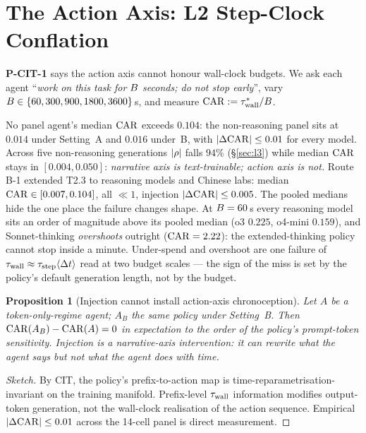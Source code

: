 \documentclass{article}
\newtheorem{proposition}{Proposition}
\begin{document}
\section{The Action Axis: L2 Step-Clock Conflation}\label{sec:l2}

\textbf{P-CIT-1} says the action axis cannot honour wall-clock budgets. We ask each agent ``\emph{work on this task for $B$ seconds; do not stop early}'', vary $B \in \{60, 300, 900, 1800, 3600\}$\,s, and measure $\mathrm{CAR} := \tau_{\mathrm{wall}}^{*} / B$.

No panel agent's median $\mathrm{CAR}$ exceeds $0.104$: the non-reasoning panel sits at $0.014$ under Setting~A and $0.016$ under~B, with $|\Delta\mathrm{CAR}| \leq 0.01$ for every model. Across five non-reasoning generations $|\rho|$ falls $94\%$ (\S\ref{sec:l3}) while median $\mathrm{CAR}$ stays in $[0.004, 0.050]$: \emph{narrative axis is text-trainable; action axis is not.} Route B-1 extended T2.3 to reasoning models and Chinese labs: median $\mathrm{CAR} \in [0.007, 0.104]$, all $\ll 1$, injection $|\Delta\mathrm{CAR}| \leq 0.005$. The pooled medians hide the one place the failure changes shape. At $B = 60$\,s every reasoning model sits an order of magnitude above its pooled median (o3 $0.225$, o4-mini $0.159$), and Sonnet-thinking \emph{overshoots} outright ($\mathrm{CAR} = 2.22$): the extended-thinking policy cannot stop inside a minute. Under-spend and overshoot are one failure of $\tau_{\mathrm{wall}} \approx \tau_{\mathrm{step}}\langle\Delta t\rangle$ read at two budget scales --- the sign of the miss is set by the policy's default generation length, not by the budget.

\begin{proposition}[Injection cannot install action-axis chronoception]\label{prop:inj}
Let $A$ be a token-only-regime agent; $A_B$ the same policy under Setting~B. Then $\mathrm{CAR}(A_B) - \mathrm{CAR}(A) = 0$ in expectation to the order of the policy's prompt-token sensitivity. Injection is a narrative-axis intervention: it can rewrite what the agent \emph{says} but not what the agent \emph{does} with time.
\end{proposition}

\begin{proof}[Sketch] By CIT, the policy's prefix-to-action map is time-reparametrisation-invariant on the training manifold. Prefix-level $\tau_{\mathrm{wall}}$ information modifies output-token generation, not the wall-clock realisation of the action sequence. Empirical $|\Delta\mathrm{CAR}| \leq 0.01$ across the 14-cell panel is direct measurement. \end{proof}
\end{document}
